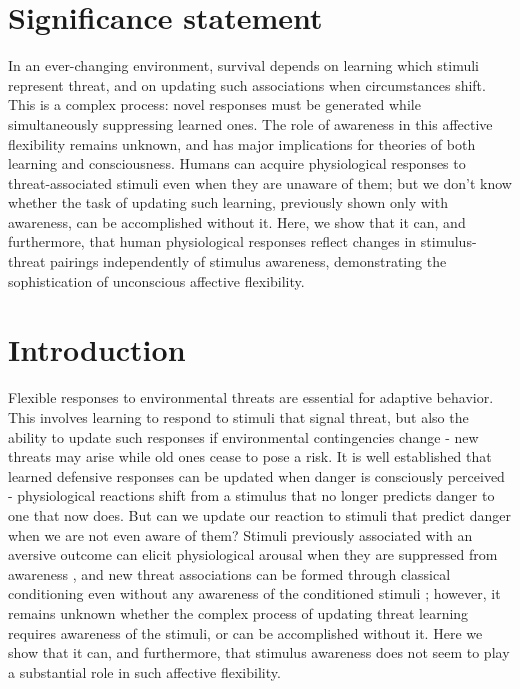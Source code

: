 \documentclass[12pt]{article}
\begin{document}
\section*{Significance statement}
\label{sec:orge3b4967}
In an ever-changing environment, survival depends on learning which
stimuli represent threat, and on updating such associations when
circumstances shift. This is a complex process: novel responses must be
generated while simultaneously suppressing learned ones. The role of
awareness in this affective flexibility remains unknown, and has major
implications for theories of both learning and consciousness. Humans can
acquire physiological responses to threat-associated stimuli even when
they are unaware of them; but we don't know whether the task of updating
such learning, previously shown only with awareness, can be accomplished
without it. Here, we show that it can, and furthermore, that human
physiological responses reflect changes in stimulus-threat pairings
independently of stimulus awareness, demonstrating the sophistication of
unconscious affective flexibility.

\clearpage

\section*{Introduction}
\label{sec:orgf00f222}
Flexible responses to environmental threats are essential for adaptive
behavior. This involves learning to respond to stimuli that signal
threat, but also the ability to update such responses if environmental
contingencies change - new threats may arise while old ones cease to
pose a risk. It is well established that learned defensive responses can
be updated when danger is consciously perceived
\cite{Morris2004,Schiller2008,Fleming2012} - physiological reactions
shift from a stimulus that no longer predicts danger to one that now
does. But can we update our reaction to stimuli that predict danger when
we are not even aware of them? Stimuli previously associated with an
aversive outcome can elicit physiological arousal when they are
suppressed from awareness
\cite{Critchley2002,Morris1998,Ohman1994,Whalen1998}, and new threat
associations can be formed through classical conditioning even without
any awareness of the conditioned stimuli
\cite{Katkin2001,Manns2002,Raio2012,Wiens2003}; however, it remains
unknown whether the complex process of updating threat learning requires
awareness of the stimuli, or can be accomplished without it. Here we
show that it can, and furthermore, that stimulus awareness does not seem
to play a substantial role in such affective flexibility.
\end{document}
